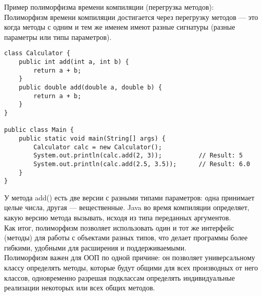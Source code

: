 Пример полиморфизма времени компиляции (перегрузка методов): \\
Полиморфизм времени компиляции достигается через перегрузку методов — это когда методы с одним и тем же именем имеют разные сигнатуры (разные параметры или типы параметров). \\
\begin{lstlisting}
class Calculator {
    public int add(int a, int b) {
        return a + b;
    }
    public double add(double a, double b) {
        return a + b;
    }
}

public class Main {
    public static void main(String[] args) {
        Calculator calc = new Calculator();
        System.out.println(calc.add(2, 3));          // Result: 5
        System.out.println(calc.add(2.5, 3.5));      // Result: 6.0
    }
}
\end{lstlisting}
У метода add() есть две версии с разными типами параметров: одна принимает целые числа, другая — вещественные. Java во время компиляции определяет, какую версию метода вызывать, исходя из типа переданных аргументов. \\
Как итог, полиморфизм позволяет использовать один и тот же интерфейс (методы) для работы с объектами разных типов, что делает программы более гибкими, удобными для расширения и поддерживаемыми. \\
Полиморфизм важен для ООП по одной причине: он позволяет универсальному классу определять методы, которые будут общими для всех производных от него классов, одновременно разрешая подклассам определять индивидуальные реализации некоторых или всех общих методов. \\

